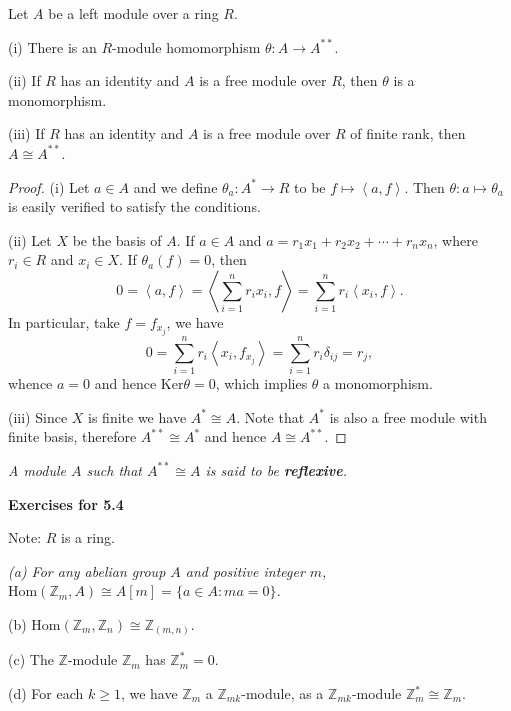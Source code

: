 \begin{theorem}
Let $A$ be a left module over a ring $R$.\par
(i) There is an $R$-module homomorphism $\theta:A\to A^{**}$.\par
(ii) If $R$ has an identity and $A$ is a free module over $R$, then $\theta$ is a monomorphism.\par
(iii) If $R$ has an identity and $A$ is a free module over $R$ of finite rank, then $A\cong A^{**}$.
\end{theorem}
\begin{proof}
(i) Let $a\in A$ and we define $\theta_a:A^*\to R$ to be $f\mapsto\left<a,f\right>$. Then $\theta:a\mapsto\theta_a$ is easily verified to satisfy the conditions.\par
(ii) Let $X$ be the basis of $A$. If $a\in A$ and $a=r_1x_1+r_2x_2+\cdots+r_nx_n$, where $r_i\in R$ and $x_i\in X$. If $\theta_a(f)=0$, then 
$$
0=\left< a,f \right> =\left< \sum_{i=1}^n{r_ix_i},f \right> =\sum_{i=1}^n{r_i\left< x_i,f \right>}.
$$
In particular, take $f=f_{x_j}$, we have 
$$
0=\sum_{i=1}^n{r_i\left< x_i,f_{x_j} \right>}=\sum_{i=1}^n{r_i\delta _{ij}}=r_j,
$$
whence $a=0$ and hence $\mathrm{Ker}\theta=0$, which implies $\theta$ a monomorphism.\par
(iii) Since $X$ is finite we have $A^*\cong A$. Note that $A^*$ is also a free module with finite basis, therefore $A^{**}\cong A^*$ and hence $A\cong A^{**}$.
\end{proof}
\begin{note}\em
A module $A$ such that $A^{**}\cong A$ is said to be \textbf{reflexive}.
\end{note}
\begin{center}
\begin{large}
    \textbf{Exercises for 5.4}
\end{large}
\end{center}
Note: $R$ is a ring.
\begin{problem}\em
(a) For any abelian group $A$ and positive integer $m$, $\mathrm{Hom}(\mathbb{Z}_m,A)\cong A[m]=\{a\in A:ma=0\}$.\par
(b) $\mathrm{Hom}(\mathbb{Z}_m,\mathbb{Z}_n)\cong\mathbb{Z}_{(m,n)}$.\par
(c) The $\mathbb{Z}$-module $\mathbb{Z}_m$ has $\mathbb{Z}_m^*=0$.\par
(d) For each $k\ge 1$, we have $\mathbb{Z}_m$ a $\mathbb{Z}_{mk}$-module, as a $\mathbb{Z}_{mk}$-module $\mathbb{Z}_m^*\cong\mathbb{Z}_m$.
\end{problem}
